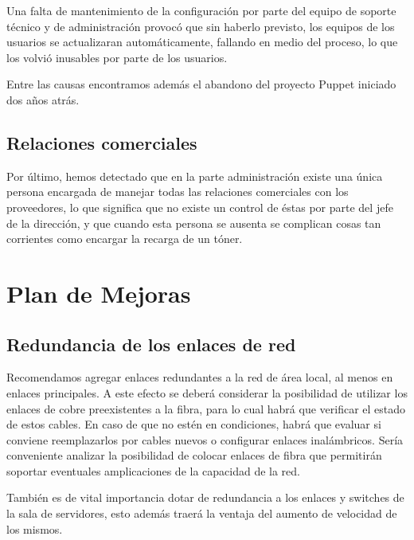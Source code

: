 \documentclass[a4paper,11pt,oneside]{article}
\begin{document}
Una falta de mantenimiento de la configuración por parte del equipo de
soporte técnico y de administración provocó que sin haberlo previsto,
los equipos de los usuarios se actualizaran automáticamente, fallando
en medio del proceso, lo que los volvió inusables por parte de los
usuarios.

Entre las causas encontramos además el abandono del proyecto Puppet
iniciado dos años atrás.
%
%
\subsection{Relaciones comerciales}
Por último, hemos detectado que en la parte administración existe una
única persona encargada de manejar todas las relaciones comerciales
con los proveedores, lo que significa que no existe un control de
éstas por parte del jefe de la dirección, y que cuando esta persona se
ausenta se complican cosas tan corrientes como encargar la recarga de
un tóner.
\newpage
\section{Plan de Mejoras}
\subsection{Redundancia de los enlaces de red}
Recomendamos agregar enlaces redundantes a la red de área local, al
menos en enlaces principales. A este efecto se deberá considerar la
posibilidad de utilizar los enlaces de cobre preexistentes a la fibra,
para lo cual habrá que verificar el estado de estos cables. En caso de
que no estén en condiciones, habrá que evaluar si conviene
reemplazarlos por cables nuevos o configurar enlaces
inalámbricos. Sería conveniente analizar la posibilidad de colocar
enlaces de fibra que permitirán soportar eventuales amplicaciones de
la capacidad de la red.

También es de vital importancia dotar de redundancia a los enlaces y
switches de la sala de servidores, esto además traerá la ventaja del
aumento de velocidad de los mismos.
%
\end{document}
